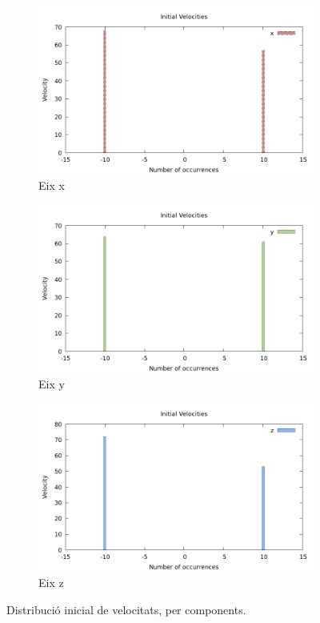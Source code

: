 \documentclass[a4paper,10pt]{article}
\begin{document}
\begin{figure}
	\centering
	\begin{subfigure}{0.3\linewidth}
		\includegraphics[width=\linewidth]{ini_vel_x}
		\caption{Eix x}
		\label{fig:ini_vel_x}
	\end{subfigure}
	\begin{subfigure}{0.3\linewidth}
		\includegraphics[width=\linewidth]{ini_vel_y}
		\caption{Eix y}
		\label{fig:ini_vel_y}
	\end{subfigure}
	\begin{subfigure}{0.3\linewidth}
		\includegraphics[width=\linewidth]{ini_vel_z} 
		\caption{Eix z}
		\label{fig:ini_vel_z}
	\end{subfigure}
	\caption{Distribució inicial de velocitats, per components.}
	\label{fig:ini_vel}
\end{figure}
\end{document}
